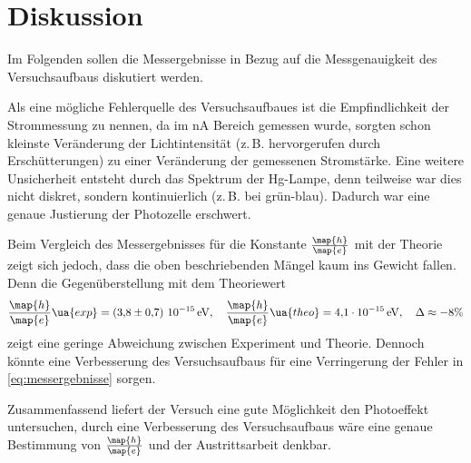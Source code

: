 \section{Diskussion}
Im Folgenden sollen die Messergebnisse in Bezug auf die Messgenauigkeit des
Versuchsaufbaus diskutiert werden.

Als eine mögliche Fehlerquelle des Versuchsaufbaues ist die Empfindlichkeit der
Strommessung zu nennen, da im $\si{\nano\ampere}$ Bereich gemessen wurde, sorgten schon kleinste
Veränderung der Lichtintensität (z.\,B. hervorgerufen durch Erschütterungen) zu einer Veränderung der gemessenen Stromstärke.
Eine weitere Unsicherheit entsteht durch das Spektrum der Hg-Lampe, denn
teilweise war dies nicht diskret, sondern kontinuierlich (z.\,B. bei grün-blau).
Dadurch war eine genaue Justierung der Photozelle erschwert.

Beim Vergleich des Messergebnisses für die Konstante $\frac{\map{h}}{\map{e}}$ mit der Theorie
zeigt sich jedoch, dass die oben beschriebenden Mängel kaum ins Gewicht fallen.
Denn die Gegenüberstellung mit dem Theoriewert\cite{scipy}
\begin{equation}
  \label{eq:abweichung}
  \frac{\map{h}}{\map{e}}\ua{exp}=\left(\num{3.8\pm 0.7}\right)\,\num{e-15}\,\si{\eV}, \quad  \frac{\map{h}}{\map{e}}\ua{theo}=\num{4.1 e-15}\,\si{\eV}, \quad \Delta\approx -8\%
\end{equation}
zeigt eine geringe Abweichung zwischen Experiment und Theorie. Dennoch könnte eine Verbesserung des Versuchsaufbaus
für eine Verringerung der Fehler in \eqref{eq:messergebnisse} sorgen.


Zusammenfassend liefert der Versuch eine gute Möglichkeit den Photoeffekt untersuchen,
durch eine Verbesserung des Versuchsaufbaus wäre eine genaue Bestimmung von $\frac{\map{h}}{\map{e}}$
und der Austrittsarbeit denkbar.
